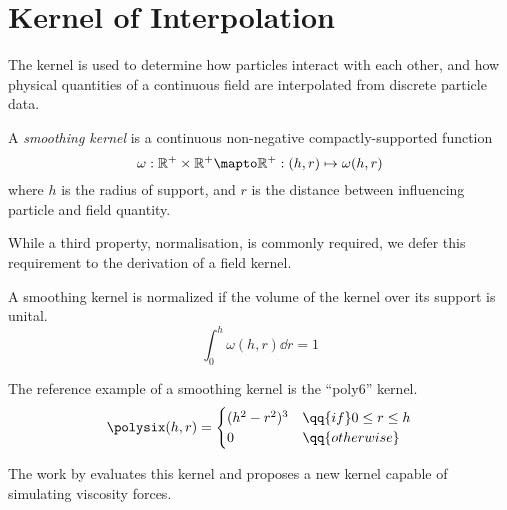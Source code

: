 
\section{Kernel of Interpolation}

The kernel is used to determine how particles interact with each other, and how physical quantities of a continuous field are interpolated from discrete particle data.

\begin{definition}
    A \emph{smoothing kernel} is a continuous non-negative compactly-supported function
    \[ \omega : \mathbb{R}^+ \times \mathbb{R}^+ \mapto \mathbb{R}^+ : (h,r) \mapsto \omega(h,r) \]
    where $h$ is the radius of support, and $r$ is the distance between influencing particle and field quantity.
\end{definition}

While a third property, normalisation, is commonly required, we defer this requirement to the derivation of a field kernel.

\begin{definition}
    A smoothing kernel is normalized if the volume of the kernel over its support is unital.
    \[ \int_0^h \omega(h,r) \dd{r} = 1 \]
\end{definition}

\begin{example}
    The reference example of a smoothing kernel is the ``poly6'' kernel.
    \[ \polysix(h,r) = \begin{cases}
        (h^2 - r^2)^3 & \qq{if} 0 \le r \le h \\
        0 & \qq{otherwise}
    \end{cases} \]
\end{example}

The work by \cite{muller03} evaluates this kernel and proposes a new kernel capable of simulating viscosity forces.
